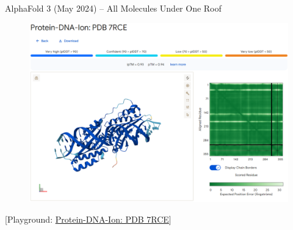\begin{frame}[allowframebreaks]{AlphaFold 3 (May 2024) – All Molecules Under One Roof}
    \framebreak

    \begin{figure}
        \centering
        \includegraphics[width=\linewidth,height=0.8\textheight,keepaspectratio]{images/science/alphafold-3-playground-3.png}
    \end{figure}
    [Playground: \href{https://alphafoldserver.com/example/examplefold_pdb_7rce}{Protein-DNA-Ion: PDB 7RCE}]
\end{frame}


